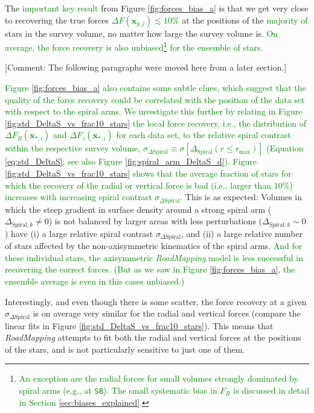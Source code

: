\documentclass[iop,revtex4,numberedappendix,appendixfloats]{emulateapj}
\newcommand{\vect}[1]{\boldsymbol{#1}}
\newcommand{\RM}{{\sl RoadMapping}}
\newcommand{\NEW}[1]{\textcolor{Green}{#1}}
\newcommand{\OLD}[1]{}
\newcommand{\COMMENT}[1]{\textcolor{ProcessBlue}{#1}}
\begin{document}
The \OLD{first and most important thing to learn}\NEW{important key result} from Figure \ref{fig:forces_bias_a} is that we get very close to recovering the true forces \NEW{$\Delta F(\vect{x}_{g,j}) \lesssim 10\%$}  at the positions of the \NEW{majority of} stars in the survey volume, no matter how large the survey volume is. \NEW{On average, the force recovery is also unbiased\footnote{\NEW{An exception are the radial forces for small volumes strongly dominated by spiral arms (e.g., at \texttt{S8}). The small systematic bias in $F_R$ is discussed in detail in Section \ref{sec:biases_explained}.}} for the ensemble of stars.}

\COMMENT{[Comment: The following paragraphs were moved here from a later section.]}

\NEW{Figure \ref{fig:forces_bias_a} also contains some subtle clues, which suggest that the quality of the force recovery could be correlated with the position of the data set with respect to the spiral arms. We investigate this further by relating in Figure \ref{fig:std_DeltaS_vs_frac10_stars} the local force recovery, i.e., the distribution of $\Delta F_R(\vect{x}_{*,i})$ and $\Delta F_z(\vect{x}_{*,i})$ for each data set, to the relative spiral contrast within the respective survey volume, $\sigma_{\Delta \text{Spiral}} \equiv \sigma[\Delta_\text{Spiral}(r\leq r_\text{max})]$ (Equation \eqref{eq:std_DeltaS}; see also Figure \ref{fig:spiral_arm_DeltaS_d}). Figure \ref{fig:std_DeltaS_vs_frac10_stars} shows that the average fraction of stars for which the recovery of the radial or vertical force is bad (i.e., larger than 10\%) increases with increasing spiral contrast $\sigma_{\Delta\text{Spiral}}$.} This is as expected: Volumes in which the steep gradient in surface density around a strong spiral arm ($\Delta_{\text{Spiral},k} \neq 0$) is not balanced by larger areas with less perturbations ($\Delta_{\text{Spiral},k} \sim 0$) have (i) a large relative spiral contrast $\sigma_{\Delta\text{Spiral}}$, and (ii) a large relative number of stars affected by the non-axisymmetric kinematics of the spiral arms. \NEW{And for these individual stars, the axisymmetric \RM{} model is less successful in recovering the correct forces. (But as we saw in Figure \ref{fig:forces_bias_a}, the ensemble average is even in this cases unbiased.)} 

Interestingly, and even though there is some scatter, the force recovery at a given $\sigma_{\Delta\text{Spiral}}$ is on average very similar for the radial and vertical forces (compare the linear fits in Figure \ref{fig:std_DeltaS_vs_frac10_stars}). This means that \RM{} attempts to fit both the radial and vertical forces at the positions of the stars, and is not particularly sensitive to just one of them.
\end{document}
